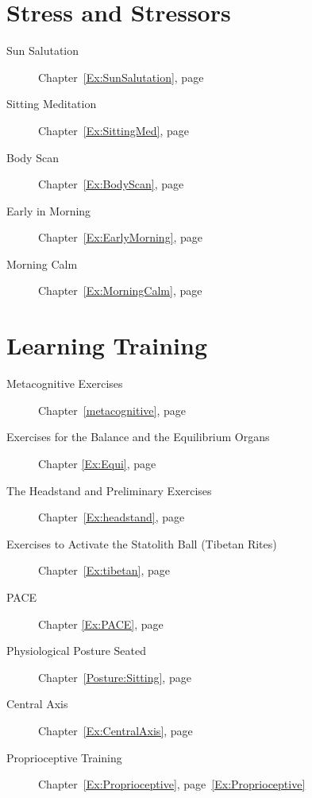 \documentclass[../main.tex]{subfiles}
\begin{document}
%
\section{Stress and Stressors}

\begin{description}
\item[Sun Salutation] Chapter~\ref{Ex:SunSalutation}, page~\pageref{Ex:SunSalutation}
\item[Sitting Meditation] Chapter~\ref{Ex:SittingMed}, page~\pageref{Ex:SittingMed}
\item[Body Scan] Chapter~\ref{Ex:BodyScan}, page~\pageref{Ex:BodyScan}
  \item[Early in Morning] Chapter~\ref{Ex:EarlyMorning}, page~\pageref{Ex:EarlyMorning}
  \item[Morning Calm] Chapter~\ref{Ex:MorningCalm}, page~\pageref{Ex:MorningCalm}
  \end{description}

\section{Learning Training}
\begin{description} 
\item[Metacognitive Exercises] Chapter~\ref{metacognitive}, page~\pageref{metacognitive}
\item[Exercises for the Balance and the Equilibrium Organs] Chapter \ref{Ex:Equi}, page~\pageref{Ex:Equi}
\item[The Headstand and Preliminary Exercises] Chapter~\ref{Ex:headstand}, page~\pageref{Ex:headstand}
\item[Exercises to Activate the Statolith Ball (Tibetan Rites)] Chapter~\ref{Ex:tibetan}, page~\pageref{Ex:tibetan}
\item[PACE] Chapter \ref{Ex:PACE}, page \pageref{Ex:PACE}
\item[Physiological Posture Seated] Chapter~\ref{Posture:Sitting}, page~\pageref{Posture:Sitting}
\item[Central Axis] Chapter~\ref{Ex:CentralAxis}, page~\pageref{Ex:CentralAxis}
\item[Proprioceptive Training] Chapter~\ref{Ex:Proprioceptive}, page~\ref{Ex:Proprioceptive}
\end{description}
\end{document}
